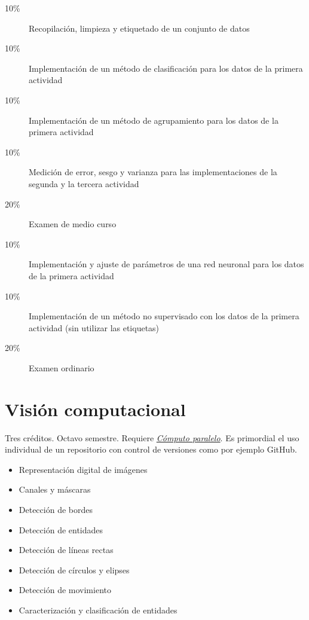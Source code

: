\documentclass{article}
\begin{document}
\begin{multicols}{4}
\begin{description}
\item[10\%]{Recopilaci\'{o}n, limpieza y etiquetado de un conjunto de datos}
\item[10\%]{Implementaci\'{o}n de un m\'{e}todo de clasificaci\'{o}n para los
  datos de la primera actividad}
\item[10\%]{Implementaci\'{o}n de un m\'{e}todo de agrupamiento para los datos
  de la primera actividad}
\item[10\%]{Medici\'{o}n de error, sesgo y varianza para las
  implementaciones de la segunda y la tercera actividad}
\item[20\%]{Examen de medio curso}  
\item[10\%]{Implementaci\'{o}n y ajuste de par\'{a}metros de una red neuronal
  para los datos de la primera actividad}
\item[10\%]{Implementaci\'{o}n de un m\'{e}todo no supervisado con los datos
  de la primera actividad (sin utilizar las etiquetas)}
\item[20\%]{Examen ordinario}
\end{description}  

\vfill\null \columnbreak

\hypertarget{vc}{\section*{Visi\'{o}n computacional}} 

Tres cr\'{e}ditos. Octavo semestre. Requiere \hyperlink{cp}{\em
  C\'{o}mputo paralelo}. Es primordial el uso individual de un
repositorio con control de versiones como por ejemplo GitHub.

\begin{itemize}
\item{Representaci\'{o}n digital de im\'{a}genes}
\item{Canales y m\'{a}scaras}
\item{Detecci\'{o}n de bordes}
\item{Detecci\'{o}n de entidades}
\item{Detecci\'{o}n de l\'{i}neas rectas}
\item{Detecci\'{o}n de c\'{i}rculos y elipses}
\item{Detecci\'{o}n de movimiento}
\item{Caracterizaci\'{o}n y clasificaci\'{o}n de entidades}
\end{itemize}


\end{multicols}
\end{document}
